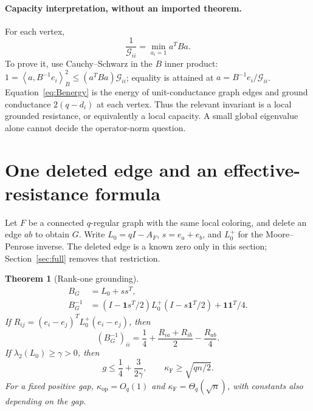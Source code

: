 \documentclass[11pt]{article}
\newtheorem{theorem}{Theorem}[section]
\theoremstyle{remark}\newtheorem{remark}[theorem]{Remark}
\newcommand{\one}{\mathbf 1}
\newcommand{\op}{\mathrm{op}}
\newcommand{\F}{\mathrm F}
\newcommand{\ip}[2]{\left\langle #1,#2\right\rangle}
\begin{document}
\paragraph{Capacity interpretation, without an imported theorem.}
For each vertex,
\begin{equation}\label{eq:capacity}
\frac1{\mathcal G_{ii}}=\min_{a_i=1}a^TBa.
\end{equation}
To prove it, use Cauchy--Schwarz in the $B$ inner product:
$1=\ip{a}{B^{-1}e_i}_B^2\leq(a^TBa)\mathcal G_{ii}$; equality is attained at
$a=B^{-1}e_i/\mathcal G_{ii}$. Equation~\eqref{eq:Benergy} is the energy of unit-conductance graph edges and ground conductance $2(q-d_i)$ at each vertex. Thus the relevant invariant is a local grounded resistance, or equivalently a local capacity. A small global eigenvalue alone cannot decide the operator-norm question.

\section{One deleted edge and an effective-resistance formula}

Let $F$ be a connected $q$-regular graph with the same local coloring, and delete an edge $ab$ to obtain $G$. Write $L_0=qI-A_F$, $s=e_a+e_b$, and $L_0^+$ for the Moore--Penrose inverse. The deleted edge is a known zero only in this section; Section~\ref{sec:full} removes that restriction.

\begin{theorem}[Rank-one grounding]\label{thm:rank-one}
\begin{align}
B_G&=L_0+ss^T,\label{eq:rankone}\\
B_G^{-1}&=(I-\one s^T/2)L_0^+(I-s\one^T/2)+\one\one^T/4.\label{eq:green-rankone}
\end{align}
If $R_{ij}=(e_i-e_j)^TL_0^+(e_i-e_j)$, then
\begin{equation}\label{eq:resistance}
(B_G^{-1})_{ii}=\frac14+\frac{R_{ia}+R_{ib}}2-\frac{R_{ab}}4.
\end{equation}
If $\lambda_2(L_0)\geq\gamma>0$, then
\begin{equation}\label{eq:expander-g}
g\leq\frac14+\frac3{2\gamma},\qquad
\kappa_{\F}\geq\sqrt{qn/2}.
\end{equation}
For a fixed positive gap, $\kappa_{\op}=O_q(1)$ and $\kappa_{\F}=\Theta_q(\sqrt n)$, with constants also depending on the gap.
\end{theorem}
\end{document}
